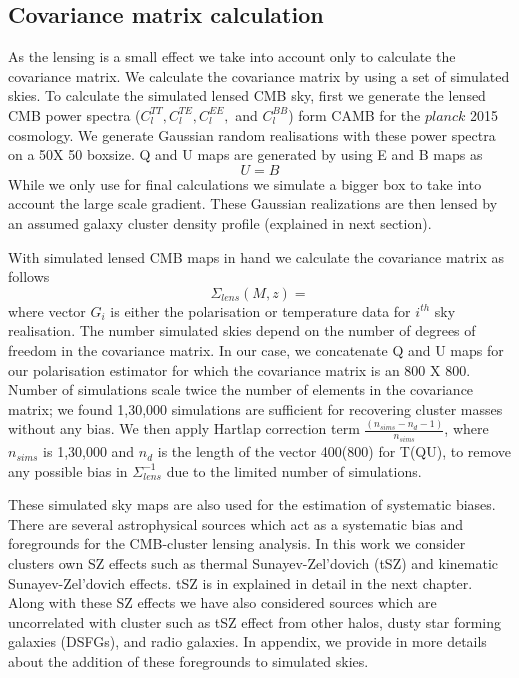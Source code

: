 \subsection{Covariance matrix calculation}
As the lensing is a small effect we take into account only \smallboxsize to calculate the covariance matrix.
 We calculate the covariance matrix by using a set of simulated skies. 
 To calculate the simulated lensed CMB sky, first we generate the lensed CMB power spectra ($C^{TT}_{l}, C^{TE}_{l}, C^{EE}_{l},$ and $C^{BB}_{l}$) form CAMB for the $planck$ 2015 cosmology.  
 We generate Gaussian random realisations with these power spectra on a 50\am X 50 \am boxsize. 
 Q and U maps are generated by using E and B maps as
 \begin{equation}
U  = B
 \end{equation}
 While we only use  \smallboxsize  for final calculations we simulate a bigger box to take into account the large scale gradient.
 These Gaussian realizations are then lensed by an assumed galaxy cluster density profile (explained in next section). 
 
 With simulated lensed CMB maps in hand we calculate the covariance matrix as follows
 \begin{equation}
 \Sigma_{lens}(M,z) = 
 \end{equation}
 where vector $G_{i}$ is either the polarisation or temperature data for $i^{th}$ sky realisation. 
 The number simulated skies depend on the number of degrees of freedom in the covariance matrix. 
 In our case, we concatenate Q and U maps for our polarisation estimator for which the covariance matrix is an 800 X 800. 
 Number of simulations scale twice the number of elements in the covariance matrix; we found 1,30,000 simulations are sufficient for recovering cluster masses without any bias. 
  We then apply Hartlap correction term $\frac{(n_{sims} -n_{d} -1)}{n_{sims}}$, where $n_{sims}$ is 1,30,000 and $n_{d}$ is the length of the vector 400(800) for T(QU), to remove any possible bias in $\Sigma^{-1}_{lens}$ due to the limited number of simulations. 
  
 These simulated sky maps are also used for the estimation of systematic biases. 
 There are several astrophysical sources which act as a systematic bias and foregrounds for the CMB-cluster lensing analysis. 
 In this work we consider clusters own SZ effects such as thermal Sunayev-Zel'dovich (tSZ) and kinematic Sunayev-Zel'dovich effects. 
 tSZ is in explained in detail in the next chapter. 
 Along with these SZ effects we have also considered sources which are uncorrelated with cluster such as tSZ effect from other halos, dusty star forming galaxies (DSFGs), and radio galaxies.
 In appendix, we provide in more details about the addition of these foregrounds to simulated skies.
 
